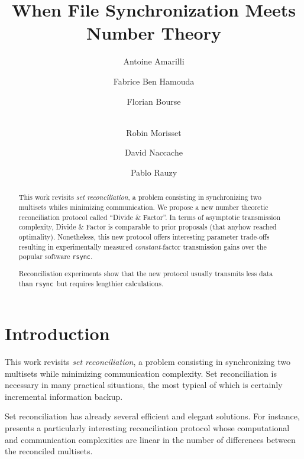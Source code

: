 \documentclass[11pt]{llncs}
\newcommand{\rsync}{\texttt{rsync}\xspace}
\begin{document}
\title{When File Synchronization Meets Number Theory}

\author{Antoine Amarilli \and Fabrice Ben Hamouda \and Florian Bourse \and\\
Robin Morisset \and David Naccache \and Pablo Rauzy}


\maketitle

\begin{abstract}
This work revisits {\sl set reconciliation}, a problem consisting in synchronizing two multisets whiles minimizing communication.
We propose a new number theoretic reconciliation protocol called ``Divide \& Factor''. In terms of asymptotic  transmission complexity, Divide \& Factor is comparable to prior proposals (that anyhow reached optimality). Nonetheless, this new protocol offers interesting parameter trade-offs resulting in experimentally measured {\sl constant}-factor transmission gains over the popular software \rsync.\smallskip

Reconciliation experiments show that the new protocol usually transmits less data than \rsync\ but requires lengthier calculations.\smallskip
\end{abstract}

\section{Introduction}

This work revisits {\sl set reconciliation}, a problem consisting in synchronizing two multisets while minimizing communication complexity. Set reconciliation is necessary in many practical situations, the most typical of which is certainly incremental information backup.\smallskip

Set reconciliation has already several efficient and elegant solutions. For instance, \cite{PSRec} presents a particularly interesting reconciliation protocol whose computational and communication complexities are linear in the number of differences between the reconciled multisets.\smallskip
\end{document}
